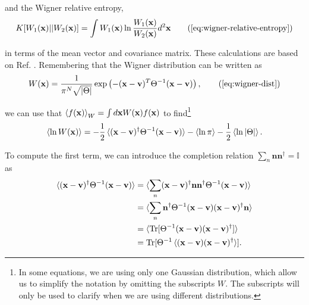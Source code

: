 \begin{apendicesenv}
\noindent and the Wigner relative entropy,
\begin{equation}
    K[W_1(\mathbf{x}) || W_2(\mathbf{x})] = \int W_1(\mathbf{x}) \ln \frac{W_{1}(\mathbf{x})}{W_{2}(\mathbf{x})} d^2 \mathbf{x}
   \tag{\ref{eq:wigner-relative-entropy}}
\end{equation}

\noindent in terms of the mean vector and covariance matrix. These calculations are based on Ref. \cite{medina-2025}. Remembering that the Wigner distribution can be written as
\begin{equation}
    W (\mathbf{x}) = \frac{1}{\pi^N \sqrt{|\Theta|}} \exp \left( -(\mathbf{x} - \mathbf{v})^T \Theta^{-1} (\mathbf{x} - \mathbf{v}) \right),
    \tag{\ref{eq:wigner-dist}}
\end{equation}

\noindent we can use that $\braket{f(\mathbf{x})}_W = \int d\mathbf{x} W(\mathbf{x}) f(\mathbf{x})$ to find\footnote{In some equations, we are using only one Gaussian distribution, which allow us to simplify the notation by omitting the subscripts $W$. The subscripts will only be used to clarify when we are using different distributions.}
\begin{equation}
    \braket{\ln W(\mathbf{x})} = - \frac{1}{2} \braket{(\mathbf{x} - \mathbf{v})^\dagger \Theta^{-1} (\mathbf{x} - \mathbf{v})} - \braket{\ln \pi} - \frac{1}{2} \braket{\ln |\Theta|}.
    \label{eq:lnW}
\end{equation}

\noindent To compute the first term, we can introduce the completion relation $\sum_n \mathbf{n} \mathbf{n}^\dagger = \mathbb{I}$ as
\begin{equation}
    \begin{split}
        \braket{(\mathbf{x} - \mathbf{v})^\dagger \Theta^{-1} (\mathbf{x} - \mathbf{v})} &= \braket{\sum_n (\mathbf{x} - \mathbf{v})^\dagger \mathbf{n} \mathbf{n}^\dagger \Theta^{-1} (\mathbf{x} - \mathbf{v})}\\
        &= \braket{\sum_n \mathbf{n}^\dagger \Theta^{-1} (\mathbf{x} - \mathbf{v})(\mathbf{x} - \mathbf{v})^\dagger \mathbf{n}} \\
        &= \braket{ \text{Tr}[ \Theta^{-1} (\mathbf{x} - \mathbf{v})(\mathbf{x} - \mathbf{v})^\dagger]}\\
        &= \text{Tr}[ \Theta^{-1} \braket{(\mathbf{x} - \mathbf{v})(\mathbf{x} - \mathbf{v})^\dagger}].
    \end{split}
    \label{eq:cyclic-trace-mean}
\end{equation}


\end{apendicesenv}

